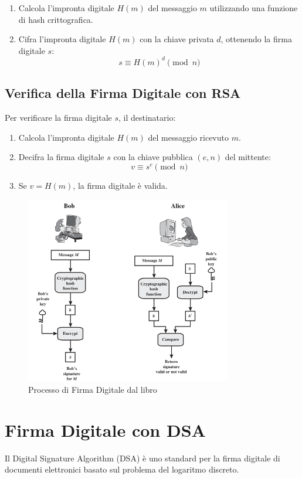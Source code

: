 \documentclass[a4paper,12pt]{report}
\begin{document}
\begin{enumerate}
    \item Calcola l'impronta digitale $H(m)$ del messaggio $m$ utilizzando una funzione di hash crittografica.
    \item Cifra l'impronta digitale $H(m)$ con la chiave privata $d$, ottenendo la firma digitale $s$:
    \[ s \equiv H(m)^d \pmod{n}\]
\end{enumerate}

\subsection{Verifica della Firma Digitale con RSA}
Per verificare la firma digitale $s$, il destinatario:

\begin{enumerate}
    \item Calcola l'impronta digitale $H(m)$ del messaggio ricevuto $m$.
    \item Decifra la firma digitale $s$ con la chiave pubblica $(e, n)$ del mittente:
    \[v \equiv s^e \pmod{n}\]
    \item Se $v = H(m)$, la firma digitale è valida.
\end{enumerate}

\begin{figure}[h]
    \centering
    \includegraphics[width=0.8\textwidth]{img/digital_signature_process.png}
    \caption{Processo di Firma Digitale dal libro \cite{stallings2011cryptography}}
    \label{fig:digital_signature_process}
\end{figure}

\section{Firma Digitale con DSA}
Il Digital Signature Algorithm (DSA) è uno standard per la firma digitale di documenti elettronici basato sul problema del logaritmo discreto.
\end{document}
